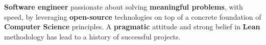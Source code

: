 
\begin{cvparagraph}
  \textbf{Software engineer} passionate about solving \textbf{meaningful problems}, with speed, by leveraging \textbf{open-source} technologies on top of a concrete foundation of \textbf{Computer Science} principles. A \textbf{pragmatic} attitude and strong belief in \textbf{Lean} methodology has lead to a history of successful projects.
\end{cvparagraph}
